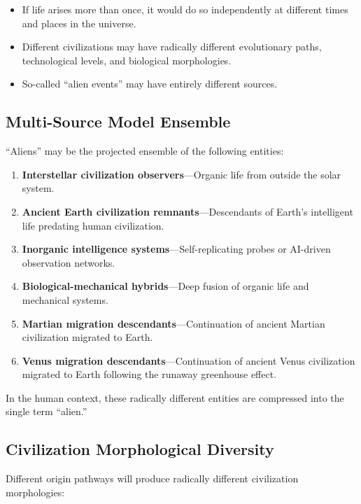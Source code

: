 \documentclass[aps,prd,twocolumn,superscriptaddress,nofootinbib]{revtex4-2}
\begin{document}
\begin{itemize}
  \item If life arises more than once, it would do so independently at different times and places in the universe.
  \item Different civilizations may have radically different evolutionary paths, technological levels, and biological morphologies.
  \item So-called ``alien events'' may have entirely different sources.
\end{itemize}

\subsection{Multi-Source Model Ensemble}\label{sec:multi-source}

``Aliens'' may be the projected ensemble of the following entities:

\begin{enumerate}
  \item \textbf{Interstellar civilization observers}---Organic life from outside the solar system.
  \item \textbf{Ancient Earth civilization remnants}---Descendants of Earth's intelligent life predating human civilization.
  \item \textbf{Inorganic intelligence systems}---Self-replicating probes or AI-driven observation networks.
  \item \textbf{Biological-mechanical hybrids}---Deep fusion of organic life and mechanical systems.
  \item \textbf{Martian migration descendants}---Continuation of ancient Martian civilization migrated to Earth.
  \item \textbf{Venus migration descendants}---Continuation of ancient Venus civilization migrated to Earth following the runaway greenhouse effect.
\end{enumerate}

In the human context, these radically different entities are compressed into the single term ``alien.''

\subsection{Civilization Morphological Diversity}\label{sec:morphological}

Different origin pathways will produce radically different civilization morphologies:
\end{document}
